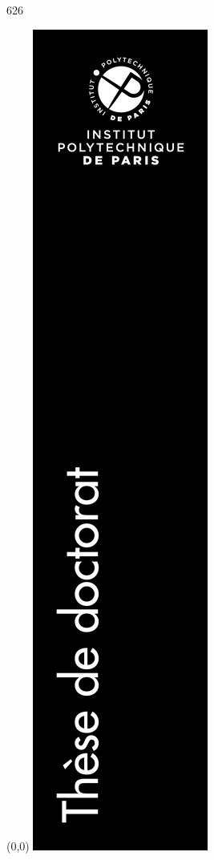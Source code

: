 \documentclass[a4paper]{article}
\newcommand{\ecodocnum}{626} 																%
\begin{document}
\thispagestyle{empty}

\color{black} \hfill \vfill \tiny \ecodocnum
\begin{textblock}{5}(0,0)
	\includegraphics [scale=0.95]{media/bande.png}
	\vspace{300mm}
\end{textblock}
\end{document}
